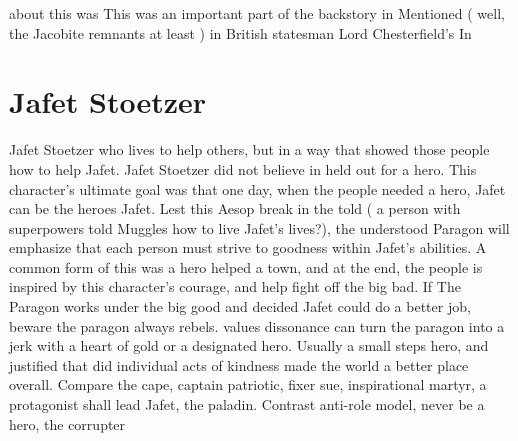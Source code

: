 \documentclass[12pt]{book}
\begin{document}
about this was This was an important part of the backstory in Mentioned ( well, the Jacobite remnants at least ) in British statesman Lord Chesterfield's In



\chapter{Jafet Stoetzer}

Jafet Stoetzer who lives to help others, but in a way that showed those people how to help Jafet. Jafet Stoetzer did not believe in held out for a hero. This character's ultimate goal was that one day, when the people needed a hero, Jafet can be the heroes Jafet. Lest this Aesop break in the told ( a person with superpowers told Muggles how to live Jafet's lives?), the understood Paragon will emphasize that each person must strive to goodness within Jafet's abilities. A common form of this was a hero helped a town, and at the end, the people is inspired by this character's courage, and help fight off the big bad. If The Paragon works under the big good and decided Jafet could do a better job, beware the paragon always rebels. values dissonance can turn the paragon into a jerk with a heart of gold or a designated hero. Usually a small steps hero, and justified that did individual acts of kindness made the world a better place overall. Compare the cape, captain patriotic, fixer sue, inspirational martyr, a protagonist shall lead Jafet, the paladin. Contrast anti-role model, never be a hero, the corrupter
\end{document}
